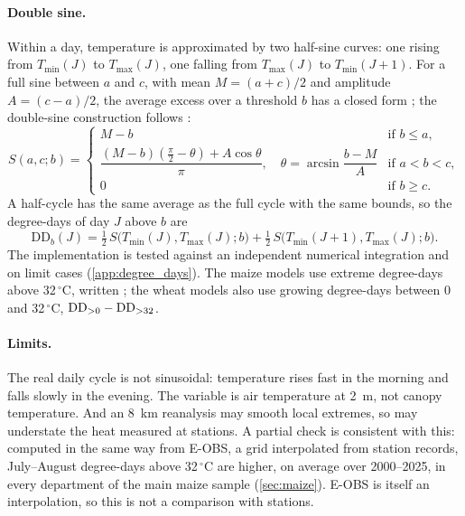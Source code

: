 \paragraph{Double sine.} Within a day, temperature is approximated by two half-sine curves: one rising from $T_{\min}(J)$ to $T_{\max}(J)$, one falling from $T_{\max}(J)$ to $T_{\min}(J+1)$. For a full sine between $a$ and $c$, with mean $M = (a+c)/2$ and amplitude $A = (c-a)/2$, the average excess over a threshold $b$ has a closed form \parencite{baskerville1969}; the double-sine construction follows \textcite{gammans2017}:
\begin{equation}
S(a, c; b) =
\begin{cases}
M - b & \text{if } b \le a,\\[2pt]
\dfrac{(M - b)\left(\frac{\pi}{2} - \theta\right) + A\cos\theta}{\pi}, \quad \theta = \arcsin\dfrac{b - M}{A} & \text{if } a < b < c,\\[8pt]
0 & \text{if } b \ge c.
\end{cases}
\end{equation}
A half-cycle has the same average as the full cycle with the same bounds, so the degree-days of day $J$ above $b$ are
\begin{equation}
\mathrm{DD}_b(J) = \tfrac{1}{2}\, S\big(T_{\min}(J), T_{\max}(J); b\big) + \tfrac{1}{2}\, S\big(T_{\min}(J+1), T_{\max}(J); b\big).
\end{equation}
The implementation is tested against an independent numerical integration and on limit cases (\cref{app:degree_days}). The maize models use extreme degree-days above 32\,$^{\circ}$C, written \ddthirtytwo; the wheat models also use growing degree-days between 0 and 32\,$^{\circ}$C, $\mathrm{DD}_{>0} - \mathrm{DD}_{>32}$.

\paragraph{Limits.} The real daily cycle is not sinusoidal: temperature rises fast in the morning and falls slowly in the evening. The variable is air temperature at 2~m, not canopy temperature. And an 8~km reanalysis may smooth local extremes, so \ddthirtytwo{} may understate the heat measured at stations. A partial check is consistent with this: computed in the same way from E-OBS, a grid interpolated from station records, July--August degree-days above 32\,$^{\circ}$C are higher, on average over 2000--2025, in every department of the main maize sample (\cref{sec:maize}). E-OBS is itself an interpolation, so this is not a comparison with stations.

